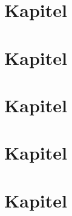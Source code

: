 \chapter{Kapitel} 


\chapter{Kapitel} 


\chapter{Kapitel} 


\chapter{Kapitel} 


\chapter{Kapitel} 


